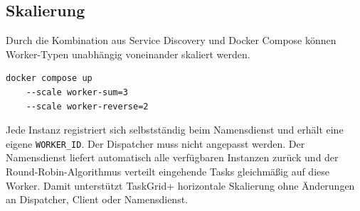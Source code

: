 \subsection{Skalierung}

Durch die Kombination aus Service Discovery und Docker Compose können Worker-Typen unabhängig voneinander skaliert werden.

\begin{lstlisting}[language=bash,caption={Skalierungsbeispiel}]
	docker compose up 
	--scale worker-sum=3 
	--scale worker-reverse=2
\end{lstlisting}
Jede Instanz registriert sich selbstständig beim Namensdienst und erhält eine eigene \texttt{WORKER\_ID}.
Der Dispatcher muss nicht angepasst werden.
Der Namensdienst liefert automatisch alle verfügbaren Instanzen zurück und der Round-Robin-Algorithmus verteilt eingehende Tasks gleichmäßig auf diese Worker.
Damit unterstützt TaskGrid+ horizontale Skalierung ohne Änderungen an Dispatcher, Client oder Namensdienst.
